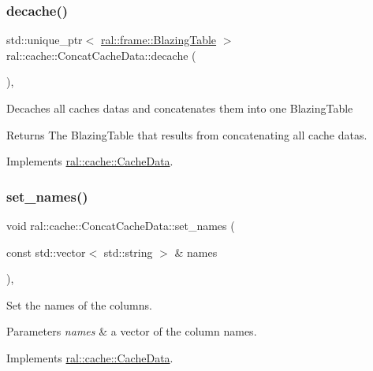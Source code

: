 \subsubsection{\texorpdfstring{decache()}{decache()}}
{\footnotesize\ttfamily std\+::unique\+\_\+ptr$<$ \hyperlink{classral_1_1frame_1_1BlazingTable}{ral\+::frame\+::\+Blazing\+Table} $>$ ral\+::cache\+::\+Concat\+Cache\+Data\+::decache (\begin{DoxyParamCaption}{ }\end{DoxyParamCaption})\hspace{0.3cm}{\ttfamily [override]}, {\ttfamily [virtual]}}

Decaches all caches datas and concatenates them into one Blazing\+Table \begin{DoxyReturn}{Returns}
The Blazing\+Table that results from concatenating all cache datas. 
\end{DoxyReturn}


Implements \hyperlink{classral_1_1cache_1_1CacheData_a2db8fdd2151babd7a07f4c6e246b710c}{ral\+::cache\+::\+Cache\+Data}.

\mbox{\label{classral_1_1cache_1_1ConcatCacheData_a02f400f33f88ba3e216f5899fa4f12b8}} 
\subsubsection{\texorpdfstring{set\+\_\+names()}{set\_names()}}
{\footnotesize\ttfamily void ral\+::cache\+::\+Concat\+Cache\+Data\+::set\+\_\+names (\begin{DoxyParamCaption}\item[{const std\+::vector$<$ std\+::string $>$ \&}]{names }\end{DoxyParamCaption})\hspace{0.3cm}{\ttfamily [override]}, {\ttfamily [virtual]}}

Set the names of the columns. 
\begin{DoxyParams}{Parameters}
{\em names} & a vector of the column names. \\
\hline
\end{DoxyParams}


Implements \hyperlink{classral_1_1cache_1_1CacheData_a3bb1623a4266ba7c961d325023ff13c6}{ral\+::cache\+::\+Cache\+Data}.

